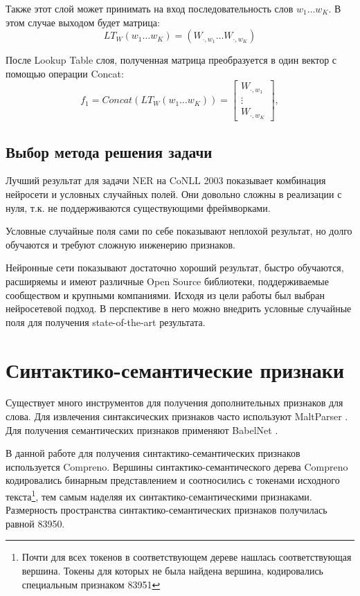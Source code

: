   Также этот слой может принимать на вход последовательность слов $w_1 \ldots w_K$.
  В этом случае выходом будет матрица:
  \[
    LT_W(w_1 \ldots w_K) = ( W_{\cdot, w_1} \ldots W_{\cdot, w_K})
  \]

  После Lookup Table слоя, полученная матрица преобразуется в один вектор с
  помощью операции Concat:
  \[
    f_{1} = Concat(LT_W(w_1 \ldots w_K)) =
      \begin{bmatrix}
        W_{\cdot, w_1} \\
        \vdots \\
        W_{\cdot, w_K}
      \end{bmatrix},
  \]


    \subsection{Выбор метода решения задачи}

      Лучший результат для задачи NER на CoNLL 2003 показывает комбинация нейросети и
      условных случайных полей. Они довольно сложны в реализации с нуля, т.к. не поддерживаются
      существующими фреймворками.

      Условные случайные поля сами по себе показывают неплохой
      результат, но долго обучаются и требуют сложную инженерию признаков.

      Нейронные сети показывают достаточно хороший результат, быстро обучаются,
      расширяемы и
      имеют различные Open Source библиотеки, поддерживаемые сообществом и крупными
      компаниями.
      Исходя из цели работы был выбран нейросетевой подход. В перспективе в него
      можно внедрить условные случайные поля для получения state-of-the-art результата.

  \section{Синтактико-семантические признаки}
    Существует много инструментов для получения дополнительных признаков для слова.
    Для извлечения синтаксических признаков часто используют MaltParser \citep{nivre2006maltparser}.
    Для получения семантических признаков применяют BabelNet \citep{navigli2010babelnet}.

    В данной работе для получения синтактико-семантических признаков используется Compreno.
    Вершины синтактико-семантического дерева Compreno кодировались бинарным представлением
    и соотносились с токенами исходного
    текста\footnote{Почти для всех токенов в соответствующем дереве нашлась соответствующая вершина.
    Токены для которых не была найдена вершина, кодировались специальным признаком 83951},
    тем самым наделяя их синтактико-се\-ман\-ти\-ческими признаками.
    Размерность пространства синтактико-се\-ман\-ти\-ческих признаков получилась равной 83950.

